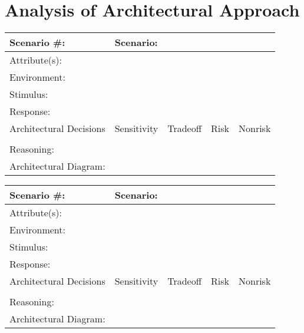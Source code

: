 \section{Analysis of Architectural Approach}

\begin{tabular}{|m{}|m{}|m{}|m{}|m{}|m{}|}
  \hline
  Scenario \#: & \multicolumn{5}{m{0.75 \textwidth}|}{Scenario:} \\ \hline
  \multicolumn{6}{|m{0.9 \textwidth}|}{Attribute(s):} \\ \hline
  \multicolumn{6}{|m{0.9 \textwidth}|}{Environment:} \\ \hline
  \multicolumn{6}{|m{0.9 \textwidth}|}{Stimulus:} \\ \hline
  \multicolumn{6}{|m{0.9 \textwidth}|}{Response:} \\ \hline
  \multicolumn{2}{|m{0.3 \textwidth}|}{Architectural Decisions} & Sensitivity & Tradeoff & Risk & Nonrisk \\ \hline
  \multicolumn{2}{|m{0.3 \textwidth}|}{} &  &  &  &  \\ \hline
  \multicolumn{6}{|m{0.9 \textwidth}|}{Reasoning:} \\ \hline
  \multicolumn{6}{|m{0.9 \textwidth}|}{Architectural Diagram: } \\ \hline
\end{tabular}

\begin{tabular}{|m{}|m{}|m{}|m{}|m{}|m{}|}
  \hline
  Scenario \#: & \multicolumn{5}{m{0.75 \textwidth}|}{Scenario:} \\ \hline
  \multicolumn{6}{|m{0.9 \textwidth}|}{Attribute(s):} \\ \hline
  \multicolumn{6}{|m{0.9 \textwidth}|}{Environment:} \\ \hline
  \multicolumn{6}{|m{0.9 \textwidth}|}{Stimulus:} \\ \hline
  \multicolumn{6}{|m{0.9 \textwidth}|}{Response:} \\ \hline
  \multicolumn{2}{|m{0.3 \textwidth}|}{Architectural Decisions} & Sensitivity & Tradeoff & Risk & Nonrisk \\ \hline
  \multicolumn{2}{|m{0.3 \textwidth}|}{} &  &  &  &  \\ \hline
  \multicolumn{6}{|m{0.9 \textwidth}|}{Reasoning:} \\ \hline
  \multicolumn{6}{|m{0.9 \textwidth}|}{Architectural Diagram: } \\ \hline
\end{tabular}

